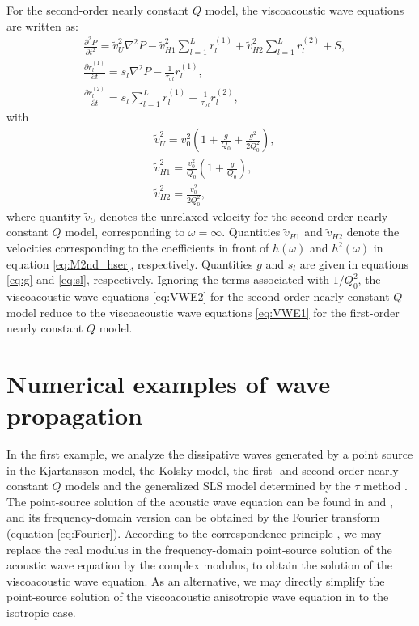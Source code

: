 \documentclass[article]{./macros/elsarticle_qh}
\begin{document}
For the second-order nearly constant $Q$ model, the viscoacoustic wave equations are written as:
\begin{equation} \label{eq:VWE2}
\begin{split}
& \frac{\partial^2 P}{\partial t^2} = \tilde{v}_{U}^2 \nabla^2 P
- \tilde{v}_{H1}^2 \sum_{l=1}^{L} r_{l}^{(1)} 
+ \tilde{v}_{H2}^2 \sum_{l=1}^{L} r_{l}^{(2)} 
+ S , \\
& \frac{\partial r_{l}^{(1)}}{\partial t} = s_{l} \nabla^2 P
- \frac{1}{\tau_{\sigma l}} r_{l}^{(1)} , \\
& \frac{\partial r_{l}^{(2)}}{\partial t} = s_{l} \sum_{l=1}^{L} r_{l}^{(1)} 
- \frac{1}{\tau_{\sigma l}} r_{l}^{(2)} ,
\end{split}
\end{equation}
with
\begin{align}
& \tilde{v}_{U}^2 = v_{0}^2 \left(
1 + \frac{g}{Q_{0}} + \frac{g^2}{2Q_{0}^2} \right), \\
& \tilde{v}_{H1}^2 = \frac{v_{0}^2}{Q_{0}} \left(1 + \frac{g}{Q_{0}} \right), \\
& \tilde{v}_{H2}^2 = \frac{v_{0}^2}{2Q_{0}^2} ,
\end{align}
where quantity $\tilde{v}_{U}$ denotes the unrelaxed velocity for the second-order nearly constant $Q$ model, corresponding to $\omega=\infty$. Quantities $\tilde{v}_{H1}$ and $\tilde{v}_{H2}$ denote the velocities corresponding to the coefficients in front of $h(\omega)$ and $h^2(\omega)$ in equation \ref{eq:M2nd_hser}, respectively. Quantities $g$ and $s_{l}$ are given in equations \ref{eq:g} and \ref{eq:sl}, respectively. Ignoring the terms associated with $1/Q_{0}^2$, the viscoacoustic wave equations \ref{eq:VWE2} for the second-order nearly constant $Q$ model reduce to the viscoacoustic wave equations \ref{eq:VWE1} for the first-order nearly constant $Q$ model.

\section{Numerical examples of wave propagation}
In the first example, we analyze the dissipative waves generated by a point source in the Kjartansson model, the Kolsky model, the first- and second-order nearly constant $Q$ models and the generalized SLS model determined by the $\tau$ method \cite[]{blanch:1995,bohlen:2002}. The point-source solution of the acoustic wave equation can be found in \cite{aki.richards:1980} and \cite{pujol:2003}, and its frequency-domain version can be obtained by the Fourier transform (equation \ref{eq:Fourier}). According to the correspondence principle \cite[]{ben-menahem.singh:1981}, we may replace the real modulus in the frequency-domain point-source solution of the acoustic wave equation by the complex modulus, to obtain the solution of the viscoacoustic wave equation. As an alternative, we may directly simplify the point-source solution of the viscoacoustic anisotropic wave equation in \cite{hao.alkhalifah:2019} to the isotropic case. 
\end{document}
